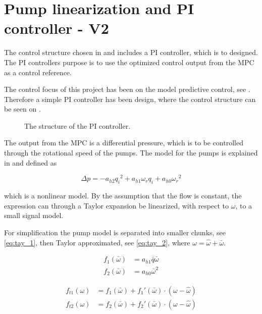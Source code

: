 \chapter{Pump linearization and PI controller - V2}
\label{cha:linear_pump2}

The control structure chosen in  and  includes a PI controller, which is to designed. The PI controllers purpose is to use the optimized control output from the MPC as a control reference. 

The control focus of this project has been on the model predictive control, see . Therefore a simple PI controller has been design, where the control structure can be seen on .

\begin{figure}[H]
\centering
  
\caption{The structure of the PI controller.}
\label{fig:simple_PI}
\end{figure}

The output from the MPC is a differential pressure, which is to be controlled through the rotational speed of the pumps. The model for the pumps is explained in  and defined as

\begin{equation*}
\Delta p = -a_{h2}{q_i}^2 + a_{h1} \omega_r q_i + a_{h0}{\omega_r}^2
\end{equation*}

which is a nonlinear model. By the assumption that the flow is constant, the expression can through a Taylor expansion be linearized, with respect to $\omega$, to a small signal model.


For simplification the pump model is separated into smaller chunks, see \eqref{eq:tay_1}, then Taylor approximated, see \eqref{eq:tay_2}, where $\omega = \hat{\omega}+\bar{\omega}$.

\begin{equation}
\begin{split}
f_1(\bar{\omega}) &= a_{h1}\bar{q}\bar{\omega} \\
f_2(\bar{\omega}) &= a_{h0}\bar{\omega}^2
\end{split}
\label{eq:tay_1}
\end{equation}


\begin{equation}
\begin{split}
f_{t1}(\omega) &= f_1(\bar{\omega}) + f_1'(\bar{\omega})\cdot(\omega - \hat{\omega}) \\
f_{t2}(\omega) &= f_2(\bar{\omega}) + f_2'(\bar{\omega})\cdot(\omega - \hat{\omega})
\end{split}
\label{eq:tay_2}
\end{equation}

